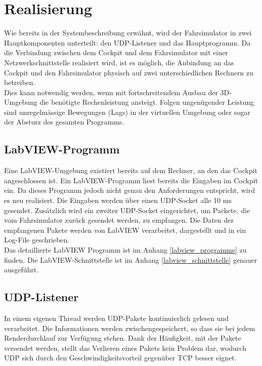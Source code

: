 \section{Realisierung}
Wie bereits in der Systembeschreibung erwähnt, wird der Fahrsimulator in zwei Hauptkomponenten unterteilt: den UDP-Listener und das Hauptprogramm. Da die Verbindung zwischen dem Cockpit und dem Fahrsimulator mit einer Netzwerkschnittstelle realisiert wird, ist es möglich, die Anbindung an das Cockpit und den Fahrsimulator physisch auf zwei unterschiedlichen Rechnern zu betreiben.\\Dies kann notwendig werden, wenn mit fortschreitendem Ausbau der 3D-Umgebung die benötigte Rechenleistung ansteigt. Folgen ungenügender Leistung sind unregelmässige Bewegungen (Lags) in der virtuellen Umgebung oder sogar der Absturz des gesamten Programms.\\

\subsection{LabVIEW-Programm}
Eine LabVIEW-Umgebung existiert bereits auf dem Rechner, an den das Cockpit angeschlossen ist. Ein LabVIEW-Programm liest bereits die Eingaben im Cockpit ein. Da dieses Programm jedoch nicht genau den Anforderungen entspricht, wird es neu realisiert. Die Eingaben werden über einen UDP-Socket alle 10 ms gesendet. Zusätzlich wird ein zweiter UDP-Socket eingerichtet, um Packete, die vom Fahrsimulator zurück gesendet werden, zu empfangen. Die Daten der empfangenen Pakete werden von LabVIEW verarbeitet, dargestellt und in ein Log-File geschrieben.\\
Das detaillierte LabVIEW Programm ist im Anhang \ref{labview_programme} zu finden. Die LabVIEW-Schnittstelle ist im Anhang \ref{labview_schnittstelle} genauer ausgeführt.

\subsection{UDP-Listener}
\label{sec:udp-listener}
In einem eigenen Thread werden UDP-Pakete kontinuierlich gelesen und verarbeitet. Die Informationen werden zwischengespeichert, so dass sie bei jedem Renderdurchlauf zur Verfügung stehen. Dank der Häufigkeit, mit der Pakete versendet werden, stellt das Verlieren eines Pakets kein Problem dar, wodurch UDP sich durch den Geschwindigkeitsvorteil gegenüber TCP besser eignet.

\newpage

